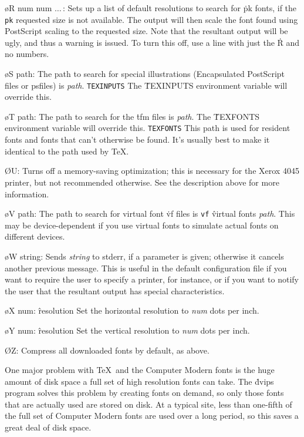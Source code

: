{\o R num num $\ldots\,$:
Sets up a list of default resolutions to search for \.{pk} fonts, if the
\^{{\tt pk}}
requested size is not available.  The output will then scale the font
found using PostScript scaling to the requested size.  Note that the
resultant output will be ugly, and thus a warning is issued.  To turn
this off, use a line with just the \.{R} and no numbers.

\o S path:  The path to search for special illustrations
(Encapsulated PostScript files or psfiles) is {\it path}.
\^{{\tt TEXINPUTS}}
The \.{TEXINPUTS} environment variable will override this.

\o T path: The path to search for the \.{tfm} files is
{\it path}.  The \.{TEXFONTS} environment variable will override this.
\^{{\tt TEXFONTS}}
This path is used for resident fonts and fonts that can't otherwise be found.
It's usually best to make it identical to the path used by \TeX.

\O U:  Turns off a memory-saving optimization; this is necessary for the
Xerox 4045 printer, but not recommended otherwise.  See the description
above for more information.

\o V path:  The path to search for virtual font \.{vf} files is
\^{{\tt vf}}
\^{virtual fonts}
{\it path}.
This may be device-dependent if you use virtual fonts to simulate
actual fonts on different devices.

\o W string:
Sends {\it string} to stderr, if a parameter is given; otherwise it cancels
another previous  message.
This is useful in the default configuration file if you want to require
the user to specify a printer, for instance, or if you want to notify
the user that the resultant output has special characteristics.

\o X num:
\^{resolution}
Set the horizontal resolution to {\it num} dots per inch.

\o Y num:
\^{resolution}
Set the vertical resolution to {\it num} dots per inch.

\O Z:  Compress all downloaded fonts by default, as above.\par}


One major problem with \TeX\ and the Computer Modern fonts is the huge
amount of disk space a full set of high resolution fonts can take.  The
\.{dvips} program solves this problem by creating fonts on demand, so only
those fonts that are actually used are stored on disk.  At a typical site,
less than one-fifth of the full set of Computer Modern fonts are used over
a long period, so this saves a great deal of disk space.

